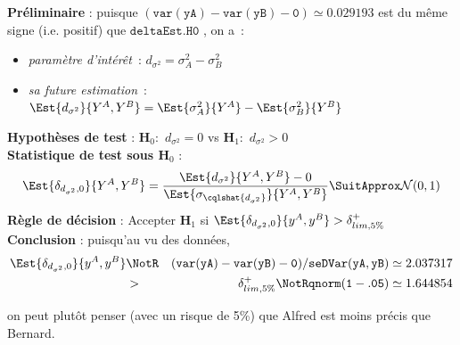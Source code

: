\documentclass[10pt]{report}
\begin{document}
\begin{exercice}
\begin{enumerate}
\begin{Correction}
\noindent \textbf{Préliminaire} : puisque $\mathtt{(var(yA)-var(yB)-0)}\simeq0.029193$ est du même signe (i.e. positif) que $\mathtt{deltaEst.H0}$ , on a~: 
      \begin{itemize}
\item \textit{paramètre d'intérêt}~: $d_{\sigma^2}=\sigma^2_{A}-\sigma^2_{B}$
\item \textit{sa future estimation}~: $\Est{d_{\sigma^2}}{Y^{A},Y^{B}}=\Est{\sigma^2_{A}}{Y^{A}}-\Est{\sigma^2_{B}}{Y^{B}}$
\end{itemize}
\noindent \textbf{Hypothèses de test} : $\mathbf{H}_0:$ $d_{\sigma^2}=0$ vs {\large $\mathbf{H}_1:$ $d_{\sigma^2}>0$}\\
\textbf{Statistique de test sous $\mathbf{H}_0$} :
  $$
  \Est{\delta_{d_{\sigma^2},0}}{Y^{A},Y^{B}}= {\displaystyle \frac{\Est{d_{\sigma^2}}{Y^{A},Y^{B}}-0}{
\Est{\sigma_{\cqlshat{d_{\sigma^2}}}}{Y^{A},Y^{B}}
}} 
  \SuitApprox \mathcal{N}(0,1)
  $$
\textbf{Règle de décision} : Accepter $\mathbf{H}_1$ si 
  $\Est{\delta_{d_{\sigma^2},0}}{y^{A},y^{B}} > \delta^+_{lim,5\%}$\\
\noindent \textbf{Conclusion} :
puisqu'au vu des données, 
  \begin{eqnarray*}
\Est{\delta_{d_{\sigma^2},0}}{y^{A},y^{B}} &\NotR&\mathtt{(var(yA)-var(yB)-0)/seDVar(yA,yB)}\simeq 2.037317\\& >  & \delta^+_{lim,5\%} \NotR \mathtt{qnorm(1-.05)}\simeq1.644854
\end{eqnarray*}
  
on peut plutôt penser (avec un risque de 5\%) que Alfred est moins précis que Bernard.
\end{Correction}


\end{enumerate}
\end{exercice}
\end{document}
